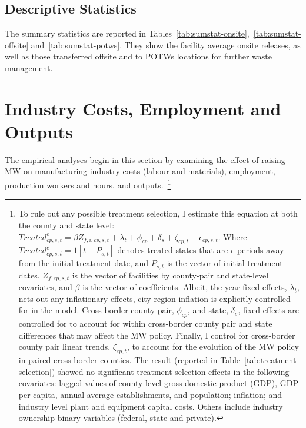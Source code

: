 \documentclass[12pt, english]{article}
\begin{document}
    \subsection{Descriptive Statistics}\label{subsec:descriptive-statistics}
    The summary statistics are reported in Tables~\ref{tab:sumstat-onsite},~\ref{tab:sumstat-offsite} and~\ref{tab:sumstat-potws}. They show the facility average onsite releases, as well as those transferred offsite and to POTWs locations for further waste management.
    
    
    
%    


    \section{Industry Costs, Employment and Outputs}\label{sec:industry-costs-employment-and-outputs}
    The empirical analyses begin in this section by examining the effect of raising MW on manufacturing industry costs (labour and materials), employment, production workers and hours, and outputs.~\footnote{\tiny To rule out any possible treatment selection, I estimate this equation at both the county and state level: $Treated_{cp,s,t}^e = \beta Z_{f,i,cp,s,t} + \lambda_{t} + \phi_{cp} + \delta_{s} + \zeta_{cp,t} + \epsilon_{cp,s,t}$. Where $Treated_{cp,s,t}^e = 1[t - P_{s,t}]$ denotes treated states that are $e$-periods away from the initial treatment date, and $P_{s,t}$ is the vector of initial treatment dates. $Z_{f,cp,s,t}$ is the vector of facilities by county-pair and state-level covariates, and $\beta$ is the vector of coefficients. Albeit, the year fixed effects, $\lambda_{t}$, nets out any inflationary effects, city-region inflation is explicitly controlled for in the model. Cross-border county pair, $\phi_{cp}$, and state, $\delta_{s}$, fixed effects are controlled for to account for within cross-border county pair and state differences that may affect the MW policy. Finally, I control for cross-border county pair linear trends, $\zeta_{cp,t}$, to account for the evolution of the MW policy in paired cross-border counties. The result (reported in Table~\ref{tab:treatment-selection}) showed no significant treatment selection effects in the following covariates: lagged values of county-level gross domestic product (GDP), GDP per capita, annual average establishments, and population; inflation; and industry level plant and equipment capital costs. Others include industry ownership binary variables (federal, state and private).}
\end{document}

